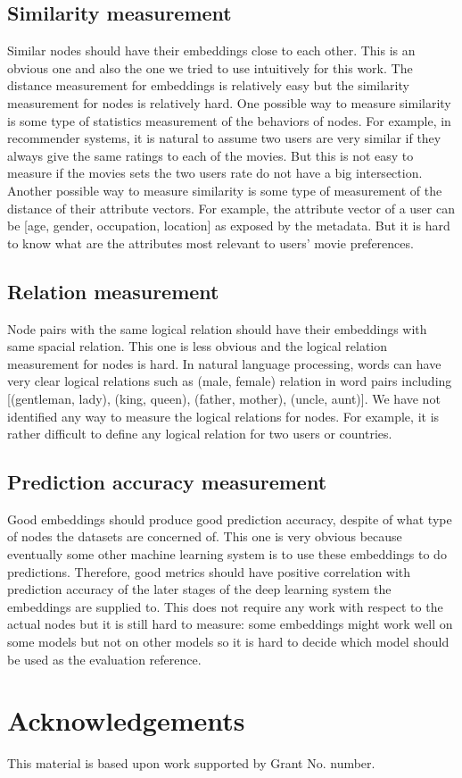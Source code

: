 \documentclass[conference]{IEEEtran}
\begin{document}
\subsection{Similarity measurement}
Similar nodes should have their embeddings close to each other.
This is an obvious one and also the one we tried to use intuitively for this work.
The distance measurement for embeddings is relatively easy but the similarity measurement for nodes is relatively hard.
One possible way to measure similarity is some type of statistics measurement of the behaviors of nodes.
For example, in recommender systems, it is natural to assume two users are very similar if they always give the same ratings to each of the movies.
But this is not easy to measure if the movies sets the two users rate do not have a big intersection.
Another possible way to measure similarity is some type of measurement of the distance of their attribute vectors.
For example, the attribute vector of a user can be [age, gender, occupation, location] as exposed by the metadata.
But it is hard to know what are the attributes most relevant to users' movie preferences.

\subsection{Relation measurement}
Node pairs with the same logical relation should have their embeddings with same spacial relation.
This one is less obvious and the logical relation measurement for nodes is hard.
In natural language processing, words can have very clear logical relations such as (male, female) relation in word pairs including [(gentleman, lady), (king, queen), (father, mother), (uncle, aunt)].
We have not identified any way to measure the logical relations for nodes.
For example, it is rather difficult to define any logical relation for two users or countries.

\subsection{Prediction accuracy measurement}
Good embeddings should produce good prediction accuracy, despite of what type of nodes the datasets are concerned of.
This one is very obvious because eventually some other machine learning system is to use these embeddings to do predictions.
Therefore, good metrics should have positive correlation with prediction accuracy of the later stages of the deep learning system the embeddings are supplied to.
This does not require any work with respect to the actual nodes but it is still hard to measure: some embeddings might work well on some models but not on other models so it is hard to decide which model should be used as the evaluation reference.

\section*{Acknowledgements}
This material is based upon work supported by Grant No. number.



\end{document}
